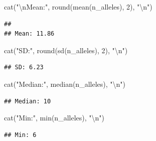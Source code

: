 \documentclass[
]{article}
\newenvironment{Shaded}{\begin{snugshade}}{\end{snugshade}}
\newcommand{\DecValTok}[1]{\textcolor[rgb]{0.00,0.00,0.81}{#1}}
\newcommand{\FunctionTok}[1]{\textcolor[rgb]{0.00,0.00,0.00}{#1}}
\newcommand{\NormalTok}[1]{#1}
\newcommand{\SpecialCharTok}[1]{\textcolor[rgb]{0.00,0.00,0.00}{#1}}
\newcommand{\StringTok}[1]{\textcolor[rgb]{0.31,0.60,0.02}{#1}}
\begin{document}
\begin{Shaded}
\begin{Highlighting}[]
\FunctionTok{cat}\NormalTok{(}\StringTok{"}\SpecialCharTok{\textbackslash{}n}\StringTok{Mean:"}\NormalTok{, }\FunctionTok{round}\NormalTok{(}\FunctionTok{mean}\NormalTok{(n\_alleles), }\DecValTok{2}\NormalTok{), }\StringTok{"}\SpecialCharTok{\textbackslash{}n}\StringTok{"}\NormalTok{)}
\end{Highlighting}
\end{Shaded}

\begin{verbatim}
## 
## Mean: 11.86
\end{verbatim}

\begin{Shaded}
\begin{Highlighting}[]
\FunctionTok{cat}\NormalTok{(}\StringTok{"SD:"}\NormalTok{, }\FunctionTok{round}\NormalTok{(}\FunctionTok{sd}\NormalTok{(n\_alleles), }\DecValTok{2}\NormalTok{), }\StringTok{"}\SpecialCharTok{\textbackslash{}n}\StringTok{"}\NormalTok{)}
\end{Highlighting}
\end{Shaded}

\begin{verbatim}
## SD: 6.23
\end{verbatim}

\begin{Shaded}
\begin{Highlighting}[]
\FunctionTok{cat}\NormalTok{(}\StringTok{"Median:"}\NormalTok{, }\FunctionTok{median}\NormalTok{(n\_alleles), }\StringTok{"}\SpecialCharTok{\textbackslash{}n}\StringTok{"}\NormalTok{)}
\end{Highlighting}
\end{Shaded}

\begin{verbatim}
## Median: 10
\end{verbatim}

\begin{Shaded}
\begin{Highlighting}[]
\FunctionTok{cat}\NormalTok{(}\StringTok{"Min:"}\NormalTok{, }\FunctionTok{min}\NormalTok{(n\_alleles), }\StringTok{"}\SpecialCharTok{\textbackslash{}n}\StringTok{"}\NormalTok{)}
\end{Highlighting}
\end{Shaded}

\begin{verbatim}
## Min: 6
\end{verbatim}
\end{document}
